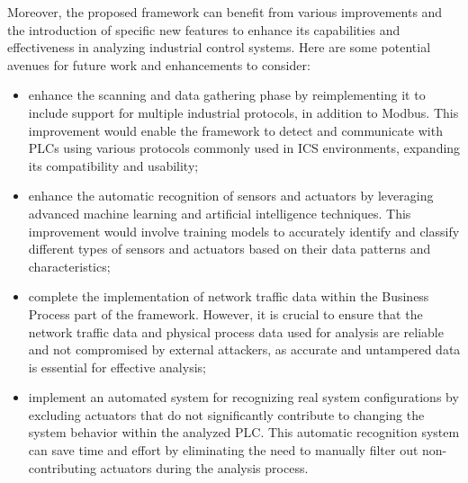Moreover, the proposed framework can benefit from various improvements and the introduction of specific new features to enhance its capabilities and effectiveness in analyzing industrial control systems. Here are some potential avenues for future work and enhancements to consider:

\begin{itemize}
	\item enhance the scanning and data gathering phase by reimplementing it to include support for multiple industrial protocols, in addition to Modbus. This improvement would enable the framework to detect and communicate with PLCs using various protocols commonly used in ICS environments, expanding its compatibility and usability;
	
	\item enhance the automatic recognition of sensors and actuators by leveraging advanced machine learning and artificial intelligence techniques. This improvement would involve training models to accurately identify and classify different types of sensors and actuators based on their data patterns and characteristics;
	
	\item complete the implementation of network traffic data within the Business Process part of the framework. However, it is crucial to ensure that the network traffic data and physical process data used for analysis are reliable and not compromised by external attackers, as accurate and untampered data is essential for effective analysis;
	
	\item implement an automated system for recognizing real system configurations by excluding actuators that do not significantly contribute to changing the system behavior within the analyzed PLC. This automatic recognition system can save time and effort by eliminating the need to manually filter out non-contributing actuators during the analysis process.
\end{itemize}

\vfill
\nolinenumbers
